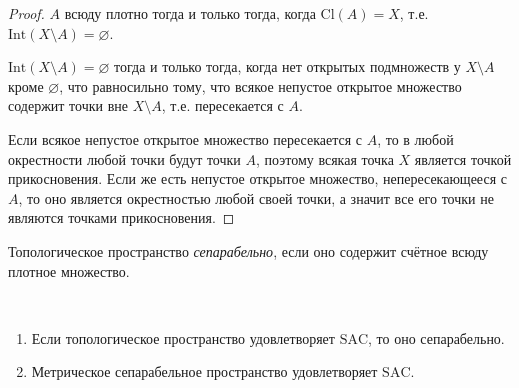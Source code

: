 \documentclass[12pt,a4paper]{article}
\newcommand{\Int}{\ensuremath{\mathrm{Int}}\xspace}
\newcommand{\Cl}{\ensuremath{\mathrm{Cl}}\xspace}
\newcommand{\SAC}{\ensuremath{\mathrm{SAC}}\xspace}
\begin{document}
    \begin{proof}
        $A$ всюду плотно тогда и только тогда, когда $\Cl(A) = X$, т.е. $\Int(X \setminus A) = \varnothing$.

        $\Int(X \setminus A) = \varnothing$ тогда и только тогда, когда нет открытых подмножеств у $X \setminus A$ кроме $\varnothing$, что равносильно тому, что всякое непустое открытое множество содержит точки вне $X \setminus A$, т.е. пересекается с $A$.

        Если всякое непустое открытое множество пересекается с $A$, то в любой окрестности любой точки будут точки $A$, поэтому всякая точка $X$ является точкой прикосновения. Если же есть непустое открытое множество, непересекающееся с $A$, то оно является окрестностью любой своей точки, а значит все его точки не являются точками прикосновения.
    \end{proof}

    \begin{definition}
        Топологическое пространство \emph{сепарабельно}, если оно содержит счётное всюду плотное множество.
    \end{definition}

    \begin{theorem}\label{separable_space_properties}\ 
        \begin{enumerate}
            \item Если топологическое пространство удовлетворяет \SAC, то оно сепарабельно.
            \item Метрическое сепарабельное пространство удовлетворяет \SAC.
        \end{enumerate}
    \end{theorem}
\end{document}
